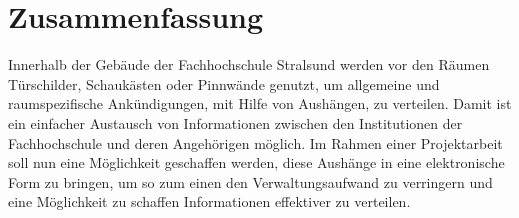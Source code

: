 \chapter*{Zusammenfassung}


Innerhalb der Gebäude der Fachhochschule Stralsund werden vor den Räumen Türschilder, Schaukästen oder Pinnwände genutzt, um allgemeine und raumspezifische Ankündigungen, mit Hilfe von Aushängen, zu verteilen. Damit ist ein einfacher Austausch von Informationen zwischen den Institutionen der Fachhochschule und deren Angehörigen möglich. 
Im Rahmen einer Projektarbeit soll nun eine Möglichkeit geschaffen werden, diese Aushänge in eine elektronische Form zu bringen, um so zum einen den Verwaltungsaufwand zu verringern und eine Möglichkeit zu schaffen Informationen effektiver zu verteilen. 